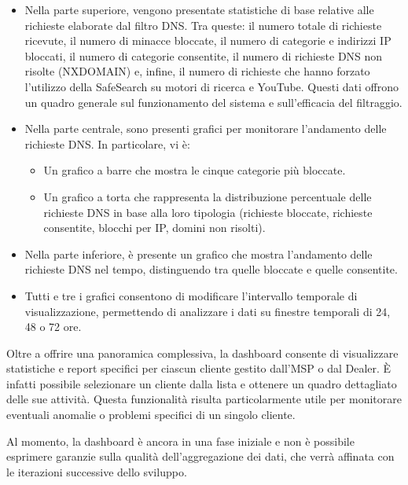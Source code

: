 \begin{itemize}
  \item Nella parte superiore, vengono presentate statistiche di base relative alle richieste elaborate dal filtro DNS. Tra queste: il numero totale di richieste ricevute, il numero di minacce bloccate, il numero di categorie e indirizzi IP bloccati, il numero di categorie consentite, il numero di richieste DNS non risolte (NXDOMAIN) e, infine, il numero di richieste che hanno forzato l’utilizzo della SafeSearch su motori di ricerca e YouTube. Questi dati offrono un quadro generale sul funzionamento del sistema e sull'efficacia del filtraggio.

  \item Nella parte centrale, sono presenti grafici per monitorare l’andamento delle richieste DNS. In particolare, vi è:
    \begin{itemize}
      \item Un grafico a barre che mostra le cinque categorie più bloccate.
      \item Un grafico a torta che rappresenta la distribuzione percentuale delle richieste DNS in base alla loro tipologia (richieste bloccate, richieste consentite, blocchi per IP, domini non risolti).
    \end{itemize}

  \item Nella parte inferiore, è presente un grafico che mostra l’andamento delle richieste DNS nel tempo, distinguendo tra quelle bloccate e quelle consentite.

  \item Tutti e tre i grafici consentono di modificare l'intervallo temporale di visualizzazione, permettendo di analizzare i dati su finestre temporali di 24, 48 o 72 ore.
\end{itemize}
%
Oltre a offrire una panoramica complessiva, la dashboard consente di visualizzare statistiche e report specifici per ciascun cliente gestito dall’MSP o dal Dealer. È infatti possibile selezionare un cliente dalla lista e ottenere un quadro dettagliato delle sue attività. Questa funzionalità risulta particolarmente utile per monitorare eventuali anomalie o problemi specifici di un singolo cliente.

Al momento, la dashboard è ancora in una fase iniziale e non è possibile esprimere garanzie sulla qualità dell'aggregazione dei dati, che verrà affinata con le iterazioni successive dello sviluppo.

